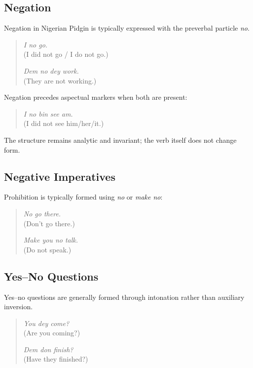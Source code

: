 \documentclass[12pt]{article}
\begin{document}
\subsection{Negation}

Negation in Nigerian Pidgin is typically expressed with the preverbal particle \textit{no}.

\begin{quote}
\textit{I no go.} \\
(I did not go / I do not go.)

\textit{Dem no dey work.} \\
(They are not working.)
\end{quote}

Negation precedes aspectual markers when both are present:

\begin{quote}
\textit{I no bin see am.} \\
(I did not see him/her/it.)
\end{quote}

The structure remains analytic and invariant; the verb itself does not change form.

\subsection{Negative Imperatives}

Prohibition is typically formed using \textit{no} or \textit{make no}:

\begin{quote}
\textit{No go there.} \\
(Don't go there.)

\textit{Make you no talk.} \\
(Do not speak.)
\end{quote}

\subsection{Yes--No Questions}

Yes--no questions are generally formed through intonation rather than auxiliary inversion.

\begin{quote}
\textit{You dey come?} \\
(Are you coming?)

\textit{Dem don finish?} \\
(Have they finished?)
\end{quote}
\end{document}

